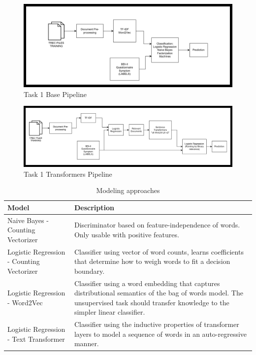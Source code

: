 \documentclass[]{style/ceurart}
\begin{document}
\begin{figure}[h]
\centering
\includegraphics[width=\textwidth]{t1basepipeline.png}
\caption{Task 1 Base Pipeline}
\label{fig:example}
\end{figure}


\begin{figure}[h]
\centering
\includegraphics[width=\textwidth]{t1transformerspipeline.png}
\caption{Task 1 Transformers Pipeline}
\label{fig:example}
\end{figure}


\begin{table}
\centering
\caption{Modeling approaches}
\renewcommand{\arraystretch}{1.2}
\begin{tabular}{p{3in}p{3in}}
\toprule
\textbf{Model} & \textbf{Description} \\ \midrule
Naive Bayes - Counting Vectorizer & Discriminator based on feature-independence of words. Only usable with positive features. \\ \midrule
Logistic Regression - Counting Vectorizer & Classifier using vector of word counts, learns coefficients that determine how to weigh words to fit a decision boundary. \\ \midrule
Logistic Regression - Word2Vec  & Classifier using a word embedding that captures distributional semantics of the bag of words model. The unsupervised task should transfer knowledge to the simpler linear classifier. \\ \midrule
Logistic Regression - Text Transformer & Classifier using the inductive properties of transformer layers to model a sequence of words in an auto-regressive manner. \\ \bottomrule
\end{tabular}
\end{table}
\end{document}
